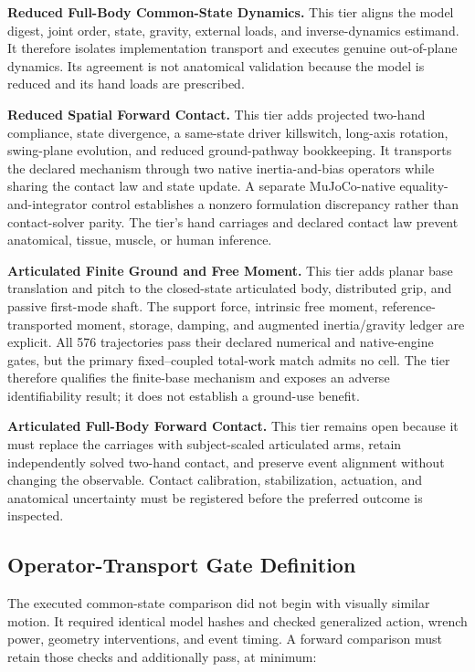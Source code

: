 \documentclass[
  letterpaper,
]{report}
\begin{document}
\textbf{Reduced Full-Body Common-State Dynamics.} This tier aligns the
model digest, joint order, state, gravity, external loads, and
inverse-dynamics estimand. It therefore isolates implementation
transport and executes genuine out-of-plane dynamics. Its agreement is
not anatomical validation because the model is reduced and its hand
loads are prescribed.

\textbf{Reduced Spatial Forward Contact.} This tier adds projected
two-hand compliance, state divergence, a same-state driver killswitch,
long-axis rotation, swing-plane evolution, and reduced ground-pathway
bookkeeping. It transports the declared mechanism through two native
inertia-and-bias operators while sharing the contact law and state
update. A separate MuJoCo-native equality-and-integrator control
establishes a nonzero formulation discrepancy rather than contact-solver
parity. The tier's hand carriages and declared contact law prevent
anatomical, tissue, muscle, or human inference.

\textbf{Articulated Finite Ground and Free Moment.} This tier adds
planar base translation and pitch to the closed-state articulated body,
distributed grip, and passive first-mode shaft. The support force,
intrinsic free moment, reference-transported moment, storage, damping,
and augmented inertia/gravity ledger are explicit. All 576 trajectories
pass their declared numerical and native-engine gates, but the primary
fixed--coupled total-work match admits no cell. The tier therefore
qualifies the finite-base mechanism and exposes an adverse
identifiability result; it does not establish a ground-use benefit.

\textbf{Articulated Full-Body Forward Contact.} This tier remains open
because it must replace the carriages with subject-scaled articulated
arms, retain independently solved two-hand contact, and preserve event
alignment without changing the observable. Contact calibration,
stabilization, actuation, and anatomical uncertainty must be registered
before the preferred outcome is inspected.

\subsection{Operator-Transport Gate
Definition}\label{sec-ladder-cross-engine-gate}

The executed common-state comparison did not begin with visually similar
motion. It required identical model hashes and checked generalized
action, wrench power, geometry interventions, and event timing. A
forward comparison must retain those checks and additionally pass, at
minimum:
\end{document}
